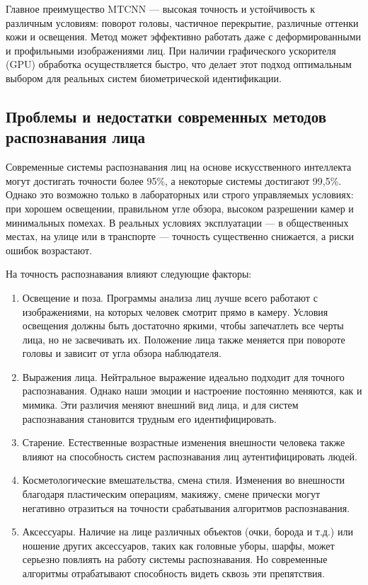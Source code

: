 Главное преимущество MTCNN — высокая точность и устойчивость к различным условиям: поворот головы, частичное перекрытие, различные оттенки кожи и освещения. Метод может эффективно работать даже с деформированными и профильными изображениями лиц. При наличии графического ускорителя (GPU) обработка осуществляется быстро, что делает этот подход оптимальным выбором для реальных систем биометрической идентификации.

\subsection{Проблемы и недостатки современных методов распознавания лица}

Современные системы распознавания лиц на основе искусственного интеллекта могут достигать точности более 95\%, а некоторые системы достигают 99,5\%.\cite{abdulaev} Однако это возможно только в лабораторных или строго управляемых условиях: при хорошем освещении, правильном угле обзора, высоком разрешении камер и минимальных помехах. В реальных условиях эксплуатации — в общественных местах, на улице или в транспорте — точность существенно снижается, а риски ошибок возрастают.

На точность распознавания влияют следующие факторы:
\begin{enumerate}
	\item Освещение и поза. Программы анализа лиц лучше всего работают с изображениями, на которых человек смотрит прямо в камеру. Условия освещения должны быть достаточно яркими, чтобы запечатлеть все черты лица, но не засвечивать их. Положение лица также меняется при повороте головы и зависит от угла обзора наблюдателя. 
	\item Выражения лица. Нейтральное выражение идеально подходит для точного распознавания. Однако наши эмоции и настроение постоянно меняются, как и мимика. Эти различия меняют внешний вид лица, и для систем распознавания становится трудным его идентифицировать.
	\item Старение. Естественные возрастные изменения внешности человека также влияют на способность систем распознавания лиц аутентифицировать людей.
	\item Косметологические вмешательства, смена стиля.  Изменения во внешности благодаря пластическим операциям, макияжу, смене прически могут негативно отразиться на точности срабатывания алгоритмов  распознавания.
	\item Аксессуары. Наличие на лице различных объектов (очки, борода и т.д.) или ношение других аксессуаров, таких как головные уборы, шарфы, может серьезно повлиять на работу системы распознавания. Но современные алгоритмы отрабатывают способность видеть сквозь эти препятствия.\cite{abdulaev}
\end{enumerate}

